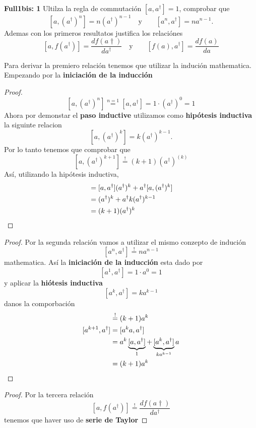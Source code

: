 \begin{ejercicio}
\textbf{Full1bis: 1} 
Ultilza la regla de commutación $[a, a^\dagger] = 1$, comprobar que 
$$
	[a, (a^\dagger)^n] = n (a^\dagger)^{n-1} \quad  \text{y} \qquad [a^n,
a^\dagger] = n a^{n-1}.
$$
Ademas con los primeros resultatos justifica los relaciónes
$$	
	[a, f(a^\dagger)] = \frac{d f(a\dagger)}{d a^\dagger} \quad \text{y} \qquad [f(a),
	a^\dagger] = \frac{d f(a)}{d a}
$$
\end{ejercicio}
\begin{solucion}
Para derivar la premiero relación tenemos que utilizar la indución mathematica.
Empezando por la \textbf{iniciación de la inducción}
\begin{proof}
$$
	[a, (a^\dagger)^n] \overset{n=1}{=} [a, a^\dagger] = 1 \cdot (a^\dagger)^0 =
1 
$$
Ahora por demonstar el \textbf{paso inductive} utilizamos como
\textbf{hipótesis inductiva} la siguinte relacion
$$
	[a, (a^\dagger)^k] = k (a^\dagger)^{k-1}.
$$
Por lo tanto tenemos que comprobar que
$$
	[a, (a^\dagger)^{k+1}] \overset{!}{=} (k+1) (a^\dagger)^{(k)}
$$
Así, utilizando la hipótesis inductiva,
\begin{align*}
	[a, a^\dagger (a^\dagger)^k] &= [a, a^\dagger] (a^\dagger)^k + a^\dagger [a,
(a^\dagger)^k] \\
	&= (a^\dagger)^k + a^\dagger k (a^\dagger)^{k-1} \\
	&= (k+1)(a^\dagger)^k \qedhere
\end{align*}
\end{proof}
\begin{proof}
Por la segunda relación vamos a utilizar el mismo conzepto de indución
$$
	[a^n, a^\dagger] \overset{!}{=} n a^{n-1}
$$
mathematica. Así la \textbf{iniciación de la inducción} esta dado por
$$
	[a^1, a^\dagger] = 1 \cdot a^0 = 1
$$
y aplicar la \textbf{hiótesis inductiva} 
$$
	[a^k, a^\dagger] = k a^{k-1}
$$
danos la comporbación
\begin{align*}
	[a^{k+1}, a^\dagger] &\overset{!}{=} (k+1)a^k \\
	[a^{k+1}, a^\dagger] &= [a^k a, a^\dagger] \\
	&=	a^k \underbrace{[a, a^\dagger]}_1 + \underbrace{[a^k,
a^\dagger]}_{ka^{k-1}} a \\
	&= (k+1)a^k \qedhere
\end{align*}
\end{proof}
\begin{proof}
Por la tercera relación
$$
	[a, f(a^\dagger)] \overset{!}{=} \frac{d f(a\dagger)}{d a^\dagger}
$$
tenemos que haver uso de \textbf{serie de Taylor}

\end{proof}
\end{solucion}
